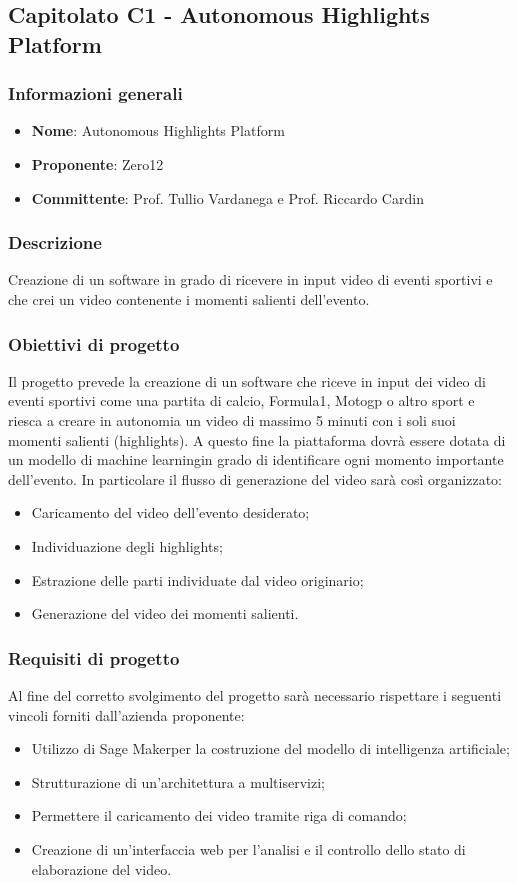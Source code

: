 \subsection{Capitolato C1 - Autonomous Highlights Platform}
\subsubsection{Informazioni generali}
\begin{itemize}
	\item \textbf{Nome}: Autonomous Highlights Platform
	\item \textbf{Proponente}: Zero12
	\item \textbf{Committente}: Prof. Tullio Vardanega e Prof. Riccardo Cardin
\end{itemize}
\subsubsection{Descrizione}
Creazione di un software in grado di ricevere in input video di eventi sportivi e che crei un video contenente i momenti salienti dell'evento.
\subsubsection{Obiettivi di progetto}
Il progetto prevede la creazione di un software che riceve in input dei video di eventi sportivi come una partita di calcio, Formula1, Motogp o altro sport e riesca a creare in autonomia un video di massimo 5 minuti con i soli suoi momenti salienti (highlights). A questo fine la piattaforma dovrà essere dotata di un modello di machine learning\glosp in grado di identificare ogni momento importante dell’evento.
In particolare il flusso di generazione del video sarà così organizzato:
\begin{itemize}
	\item Caricamento del video dell'evento desiderato;
	\item Individuazione degli highlights;
	\item Estrazione delle parti individuate dal video originario;
	\item Generazione del video dei momenti salienti.
\end{itemize}
\subsubsection{Requisiti di progetto}
Al fine del corretto svolgimento del progetto sarà necessario rispettare i seguenti vincoli forniti dall'azienda proponente:
\begin{itemize}
	\item Utilizzo di Sage Maker\glosp per la costruzione del modello di intelligenza artificiale\glo;
	\item Strutturazione di un'architettura a multiservizi\glo;
	\item Permettere il caricamento dei video tramite riga di comando;
	\item Creazione di un'interfaccia web per l'analisi e il controllo dello stato di elaborazione del video.
\end{itemize}
